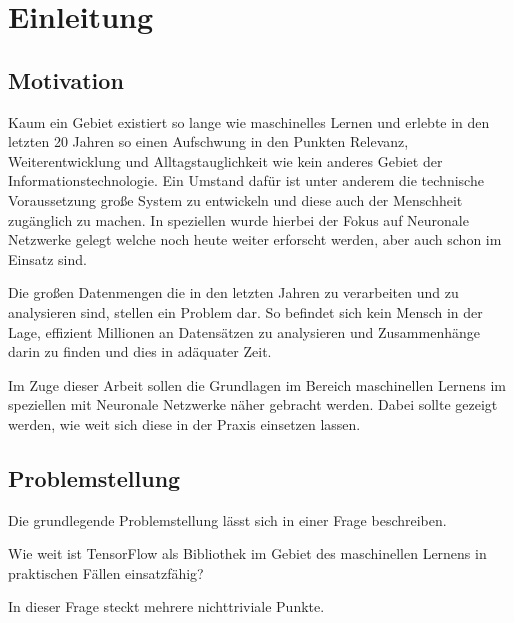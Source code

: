 \chapter{Einleitung}
\label{cha:Einleitung}

\section{Motivation}

Kaum ein Gebiet existiert so lange wie maschinelles Lernen und erlebte in den letzten 20 Jahren so einen Aufschwung in den Punkten Relevanz, Weiterentwicklung und Alltagstauglichkeit wie kein anderes Gebiet der Informationstechnologie. 
Ein Umstand dafür ist unter anderem die technische Voraussetzung große System zu entwickeln und diese auch der Menschheit zugänglich zu machen. 
In speziellen wurde hierbei der Fokus auf Neuronale Netzwerke gelegt welche noch heute weiter erforscht werden, aber auch schon im Einsatz sind. \newline

\noindent
Die großen Datenmengen die in den letzten Jahren zu verarbeiten und zu analysieren sind, stellen ein Problem dar. 
So befindet sich kein Mensch in der Lage, effizient Millionen an Datensätzen zu analysieren und Zusammenhänge darin zu finden und dies in adäquater Zeit. \newline

\noindent
Im Zuge dieser Arbeit sollen die Grundlagen im Bereich maschinellen Lernens im speziellen mit Neuronale Netzwerke näher gebracht werden. 
Dabei sollte gezeigt werden, wie weit sich diese in der Praxis einsetzen lassen. 

\section{Problemstellung}

Die grundlegende Problemstellung lässt sich in einer Frage beschreiben. \newline

Wie weit ist TensorFlow als Bibliothek im Gebiet des maschinellen Lernens in praktischen Fällen einsatzfähig? \newline

\noindent
In dieser Frage steckt mehrere nichttriviale Punkte. 

